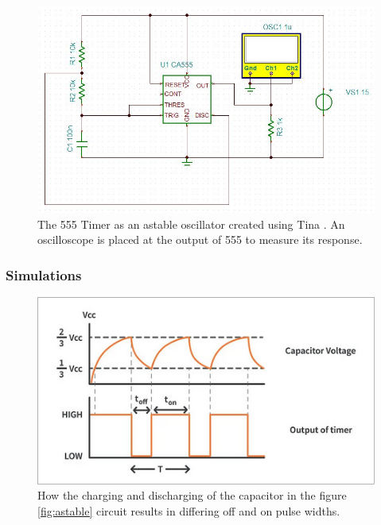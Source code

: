 \documentclass[%
 reprint,
 amsmath,amssymb,
 aps,
]{revtex4-2}
\begin{document}
    \begin{figure}
        \includegraphics[width=1.4\columnwidth]{Images/astableTina}
        \caption{\label{fig:astableTina}The 555 Timer as an astable oscillator created using Tina \cite{tina}. An oscilloscope is placed at the output of 555 to measure its response.}
    \end{figure}

        \subsubsection{Simulations}

        \begin{figure}
        \includegraphics[width=0.9\columnwidth]{Images/astableCapacitor.png}
        \caption{\label{fig:astableCapacitor}How the charging and discharging of the capacitor in the figure \ref{fig:astable} circuit results in differing off and on pulse widths.}
        \end{figure}
\end{document}
